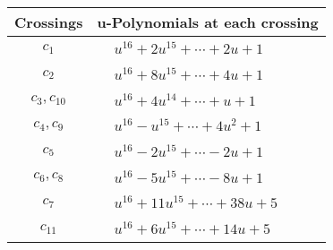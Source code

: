 \documentclass[1p]{elsarticle_modified}
\theoremstyle{definition}
\begin{document}
\begin{tabular}{m{50pt}|m{274pt}}
Crossings & \hspace{64pt}u-Polynomials at each crossing \\
\hline $$\begin{aligned}c_{1}\end{aligned}$$&$\begin{aligned}
&u^{16}+2 u^{15}+\cdots+2 u+1
\end{aligned}$\\
\hline $$\begin{aligned}c_{2}\end{aligned}$$&$\begin{aligned}
&u^{16}+8 u^{15}+\cdots+4 u+1
\end{aligned}$\\
\hline $$\begin{aligned}c_{3},c_{10}\end{aligned}$$&$\begin{aligned}
&u^{16}+4 u^{14}+\cdots+u+1
\end{aligned}$\\
\hline $$\begin{aligned}c_{4},c_{9}\end{aligned}$$&$\begin{aligned}
&u^{16}- u^{15}+\cdots+4 u^2+1
\end{aligned}$\\
\hline $$\begin{aligned}c_{5}\end{aligned}$$&$\begin{aligned}
&u^{16}-2 u^{15}+\cdots-2 u+1
\end{aligned}$\\
\hline $$\begin{aligned}c_{6},c_{8}\end{aligned}$$&$\begin{aligned}
&u^{16}-5 u^{15}+\cdots-8 u+1
\end{aligned}$\\
\hline $$\begin{aligned}c_{7}\end{aligned}$$&$\begin{aligned}
&u^{16}+11 u^{15}+\cdots+38 u+5
\end{aligned}$\\
\hline $$\begin{aligned}c_{11}\end{aligned}$$&$\begin{aligned}
&u^{16}+6 u^{15}+\cdots+14 u+5
\end{aligned}$\\
\hline
\end{tabular}\\~\\
\end{document}
